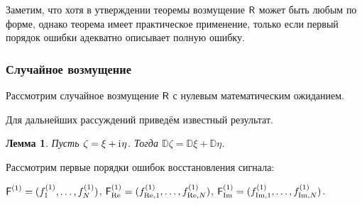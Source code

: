\documentclass[specialist,
               substylefile = spbu.rtx,
               subf,href,colorlinks=true, 12pt]{disser}
\newtheorem*{notice*}{Замечание}
\newtheorem{remark}{Замечание}
\newtheorem{lemma}{Лемма}
\DeclareMathOperator{\rk}{rk}
\begin{document}
Заметим, что хотя в утверждении теоремы возмущение $\textsf{R}$ может быть любым по форме, однако теорема имеет практическое применение, только если первый порядок ошибки адекватно описывает полную ошибку.




\subsubsection{Случайное возмущение}

Рассмотрим случайное возмущение $\textsf{R}$ с нулевым математическим ожиданием.

Для дальнейших рассуждений приведём известный результат.
\begin{lemma} \label{std:disp}
	Пусть $\zeta = \xi + \mathrm{i}\mkern1mu\eta$. Тогда $\mathbb{D}\zeta = \mathbb{D}\xi + \mathbb{D}\eta$.
\end{lemma}

Рассмотрим первые порядки ошибок восстановления сигнала:

$\textsf{F}^{(1)} = (f^{(1)}_1, \ldots, f^{(1)}_N)$, $\textsf{F}^{(1)}_{\Re} = (f^{(1)}_{\Re,1}, \ldots, f^{(1)}_{\Re, N})$, $\textsf{F}^{(1)}_{\Im} = (f^{(1)}_{\Im,1}, \ldots, f^{(1)}_{\Im, N})$.
\end{document}
